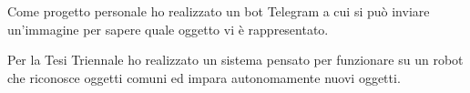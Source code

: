 \documentclass[]{deedy-resume-openfont}
\begin{document}
\begin{minipage}[t]{0.66\textwidth}
Come progetto personale ho realizzato un bot Telegram a cui si può inviare un'immagine per sapere quale oggetto vi è rappresentato.

Per la Tesi Triennale ho realizzato un sistema pensato per funzionare su un robot che riconosce oggetti comuni ed impara autonomamente nuovi oggetti.



\end{minipage} 
\end{document}
